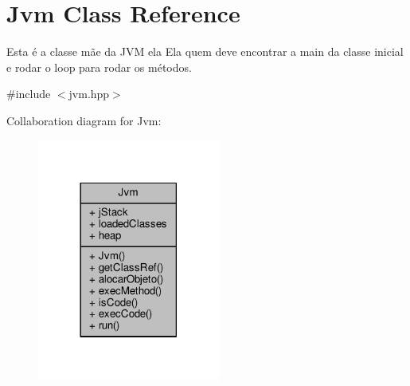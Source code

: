 \hypertarget{classJvm}{\section{Jvm Class Reference}
\label{classJvm}
}


Esta é a classe mãe da J\+V\+M ela Ela quem deve encontrar a main da classe inicial e rodar o loop para rodar os métodos.  




{\ttfamily \#include $<$jvm.\+hpp$>$}



Collaboration diagram for Jvm\+:\nopagebreak
\begin{figure}[H]
\begin{center}
\leavevmode
\includegraphics[width=170pt]{classJvm__coll__graph}
\end{center}
\end{figure}
